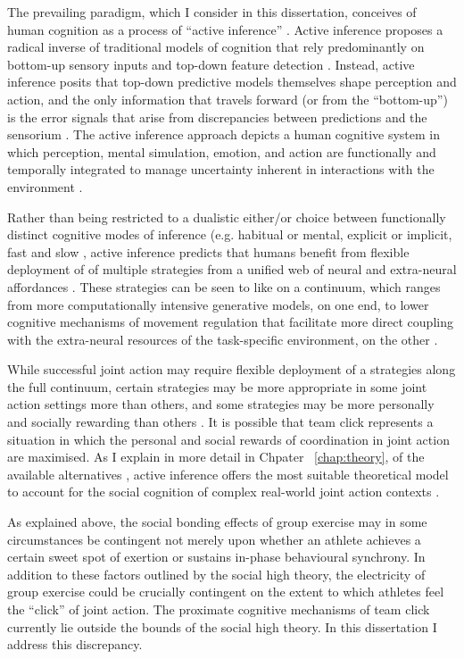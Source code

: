 \begin{CJK}{UTF8}{gbsn}
The prevailing paradigm, which I consider in this dissertation, conceives of human cognition as a process of ``active inference'' \citep{Friston2010}.  Active inference \citep[and the predictive coding paradigm which it extends, see][]{Clark2013} proposes a radical inverse of traditional models of cognition that rely predominantly on bottom-up sensory inputs and top-down feature detection \citep{Marr1985}. Instead, active inference posits that top-down predictive models themselves shape perception and action, and the only information that travels forward (or from the ``bottom-up'') is the error signals that arise from discrepancies between predictions and the sensorium \citep{Clark2015}.  The active inference approach  depicts a human cognitive system in which perception, mental simulation, emotion, and action are functionally and temporally integrated to manage uncertainty inherent in interactions with the environment \citep{Clark2013}.

Rather than being restricted to a dualistic either/or choice between functionally distinct cognitive modes of inference (e.g. habitual or mental, explicit or implicit, fast and slow \citep[cf.][]{Dienes1999,Kahneman2011}, active inference predicts that humans benefit from flexible deployment of of multiple strategies from a unified web of neural and extra-neural affordances \citep{Pezzulo2013,Clark2015}.  These strategies can be seen to like on a continuum, which ranges from more computationally intensive generative models, on one end, to lower cognitive mechanisms of movement regulation that facilitate more direct coupling with the extra-neural resources of the task-specific environment, on the other \citep{Riley2011}.

While successful joint action may require flexible deployment of a strategies along the full continuum, certain strategies may be more appropriate in some joint action settings more than others, and some strategies may be more personally and socially rewarding than others \citep{Clark2015}.  It is possible that team click represents a situation in which the personal and social rewards of coordination in joint action are maximised. As I explain in more detail in Chpater ~\ref{chap:theory}, of the available alternatives \citep[see, for example,][]{Keller2016}, active inference offers the most suitable theoretical model to account for the social cognition of complex real-world joint action contexts \citep{Friston2015,Pesquita2017}.

As explained above, the social bonding effects of group exercise may in some circumstances be contingent not merely upon whether an athlete achieves a certain sweet spot of exertion or sustains in-phase behavioural synchrony.  In addition to these factors outlined by the social high theory, the electricity of group exercise could be crucially contingent on the extent to which athletes feel the ``click'' of joint action.  The proximate cognitive mechanisms of team click currently lie outside the bounds of the social high theory.  In this dissertation I address this discrepancy.



\end{CJK}
